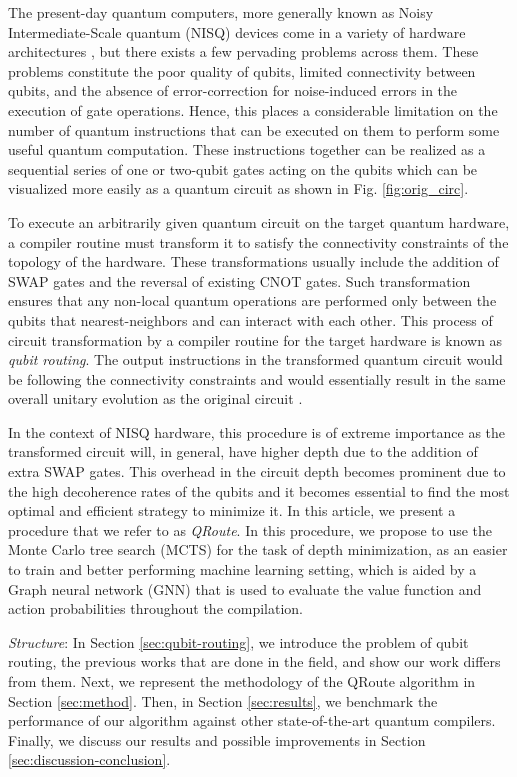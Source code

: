 \documentclass[%
 reprint,
 amsmath,amssymb,
 aps,
]{revtex4-2}
\begin{document}
The present-day quantum computers, more generally known as Noisy Intermediate-Scale quantum (NISQ) devices \cite{preskill} come in a variety of hardware architectures \cite{IBMQ, GoogleSyncamore, RigettiAspen}, but there exists a few pervading problems across them. These problems constitute the poor quality of qubits, limited connectivity between qubits, and the absence of error-correction for noise-induced errors in the execution of gate operations. Hence, this places a considerable limitation on the number of quantum instructions that can be executed on them to perform some useful quantum computation. These instructions together can be realized as a sequential series of one or two-qubit gates acting on the qubits which can be visualized more easily as a quantum circuit as shown in Fig. \ref{fig:orig_circ}. 

To execute an arbitrarily given quantum circuit on the target quantum hardware, a compiler routine must transform it to satisfy the connectivity constraints of the topology of the hardware. These transformations usually include the addition of SWAP gates and the reversal of existing CNOT gates. Such transformation ensures that any non-local quantum operations are performed only between the qubits that nearest-neighbors and can interact with each other. This process of circuit transformation by a compiler routine for the target hardware is known as \textit{qubit routing}. The output instructions in the transformed quantum circuit would be following the connectivity constraints and would essentially result in the same overall unitary evolution as the original circuit \citep{qroute_dqn2}. 

In the context of NISQ hardware, this procedure is of extreme importance as the transformed circuit will, in general, have higher depth due to the addition of extra SWAP gates. This overhead in the circuit depth becomes prominent due to the high decoherence rates of the qubits and it becomes essential to find the most optimal and efficient strategy to minimize it. In this article, we present a procedure that we refer to as \textit{QRoute}. In this procedure, we propose to use the Monte Carlo tree search (MCTS) for the task of depth minimization, as an easier to train and better performing machine learning setting, which is aided by a Graph neural network (GNN) that is used to evaluate the value function and action probabilities throughout the compilation.

\textit{Structure}: In Section \ref{sec:qubit-routing}, we introduce the problem of qubit routing, the previous works that are done in the field, and show our work differs from them. Next, we represent the methodology of the QRoute algorithm in Section \ref{sec:method}. Then, in Section \ref{sec:results}, we benchmark the performance of our algorithm against other state-of-the-art quantum compilers. Finally, we discuss our results and  possible improvements in Section \ref{sec:discussion-conclusion}.
\end{document}
